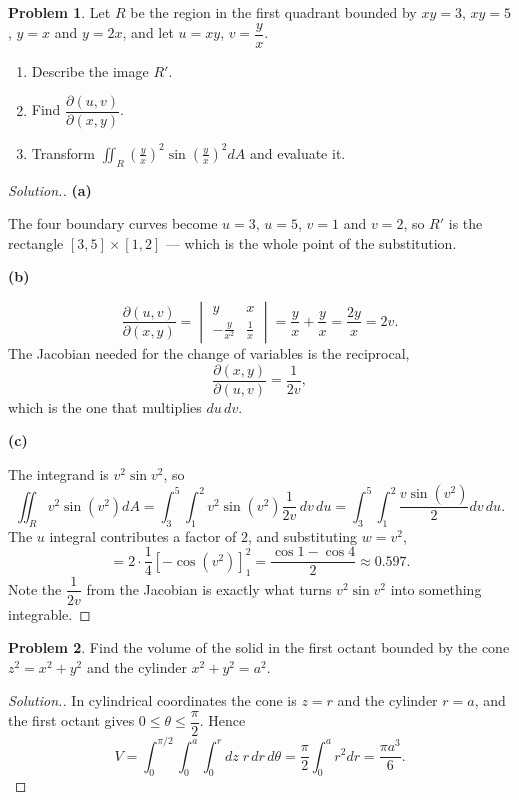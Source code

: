 \documentclass[11pt,a4paper]{article}
\theoremstyle{definition}
\newtheorem{problemx}{Problem}[subsection]
\newenvironment{problem}{\begin{problemx}}{\end{problemx}}
\newenvironment{solution}
  {\renewcommand{\qedsymbol}{}\begin{proof}[\textit{Solution}.]}
  {\end{proof}}
\newcommand{\subhead}[1]{%
  \par\medskip\noindent\textbf{#1}\par\nobreak\smallskip}
\begin{document}
\begin{problem}
Let $R$ be the region in the first quadrant bounded by $xy=3$, $xy=5$, $y=x$
and $y=2x$, and let $u = xy$, $v = \dfrac{y}{x}$.
\begin{enumerate}
\item[(a)] Describe the image $R'$.
\item[(b)] Find $\dfrac{\partial(u,v)}{\partial(x,y)}$.
\item[(c)] Transform
$\displaystyle{\iint_R\left(\frac{y}{x}\right)^2\sin\left(\frac yx\right)^2dA}$ and
evaluate it.
\end{enumerate}
\end{problem}
\begin{solution}
\subhead{(a)}
The four boundary curves become $u=3$, $u=5$, $v=1$ and $v=2$, so $R'$ is the
rectangle $[3,5]\times[1,2]$ --- which is the whole point of the substitution.

\subhead{(b)}
\[\frac{\partial(u,v)}{\partial(x,y)}
= \begin{vmatrix} y & x\\ -\frac{y}{x^2} & \frac1x\end{vmatrix}
= \frac{y}{x} + \frac{y}{x} = \frac{2y}{x} = 2v .\]
The Jacobian needed for the change of variables is the reciprocal,
\[\frac{\partial(x,y)}{\partial(u,v)} = \frac{1}{2v},\]
which is the one that multiplies $du\,dv$.

\subhead{(c)}
The integrand is $v^2\sin v^2$, so
\[\iint_R v^2\sin(v^2)dA
= \int_3^5\int_1^2 v^2\sin(v^2)\frac{1}{2v}\,dv\,du
= \int_3^5\int_1^2\frac{v\sin(v^2)}{2}dv\,du .\]
The $u$ integral contributes a factor of $2$, and substituting $w = v^2$,
\[= 2\cdot\frac14[-\cos(v^2)]_1^2
= \frac{\cos 1 - \cos 4}{2}\approx 0.597 .\]
Note the $\dfrac{1}{2v}$ from the Jacobian is exactly what turns
$v^2\sin v^2$ into something integrable.
\end{solution}

\begin{problem}
Find the volume of the solid in the first octant bounded by the cone
$z^2 = x^2+y^2$ and the cylinder $x^2+y^2 = a^2$.
\end{problem}
\begin{solution}
In cylindrical coordinates the cone is $z=r$ and the cylinder $r=a$, and the
first octant gives $0\leq\theta\leq\dfrac{\pi}{2}$. Hence
\[V = \int_0^{\pi/2}\int_0^a\int_0^r dz\;r\,dr\,d\theta
= \frac{\pi}{2}\int_0^a r^2dr = \frac{\pi a^3}{6}.\]
\end{solution}
\end{document}
